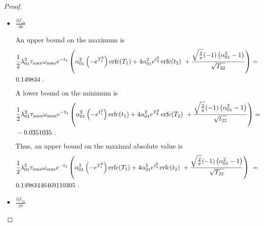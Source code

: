 \documentclass{article}
\DeclareMathOperator{\erfc}{erfc}
\begin{document}
\begin{proof}
\begin{itemize}
\item $\frac{\partial {\mathcal J}_{21}}{\partial \nu}$

An upper bound on the maximum is
\begin{align}
&\frac{1}{2} \lambda_{\rm 01}^2 \tau_{\rm max} \omega_{\rm max}
  e^{-t_4} \left(\alpha_{\rm 01}^2
  \left(-e^{T_1^2}\right) \erfc (T_1)+4
  \alpha_{\rm 01}^2 e^{t_2^2}
  \erfc (t_2)\ +  \frac{\sqrt{\frac{2}{\pi }} (-1)
  \left(\alpha_{\rm 01}^2-1\right)}{\sqrt{T_{22}}}\right) = \ \\ \nonumber
   & 0.149834\ .
\end{align}
A lower bound on the minimum is
\begin{align}
&\frac{1}{2} \lambda_{\rm 01}^2 \tau_{\rm max} \omega_{\rm max}
  e^{-t_4} \left(\alpha_{\rm 01}^2
  \left(-e^{t_1^2}\right) \erfc (t_1)+4
  \alpha_{\rm 01}^2 e^{T_2^2}
  \erfc (T_2)\ +  \frac{\sqrt{\frac{2}{\pi }} (-1)
  \left(\alpha_{\rm 01}^2-1\right)}{\sqrt{t_{22}}}\right) = \\ \nonumber
  &-0.0351035\ .
\end{align}
Thus, an upper bound on the maximal absolute value is 
\begin{align}
&\frac{1}{2} \lambda_{\rm 01}^2 \tau_{\rm max} \omega_{\rm max}
  e^{-t_4} \left(\alpha_{\rm 01}^2
  \left(-e^{T_1^2}\right) \erfc (T_1)+4
  \alpha_{\rm 01}^2 e^{t_2^2}
  \erfc (t_2)\ + \frac{\sqrt{\frac{2}{\pi }} (-1)
  \left(\alpha_{\rm 01}^2-1\right)}{\sqrt{T_{22}}}\right) \ 
  = \ \\ \nonumber
&0.14983446469110305 \ .
\end{align}

\item $\frac{\partial {\mathcal J}_{21}}{\partial \tau}$


\end{itemize}
\end{proof}
\end{document}
